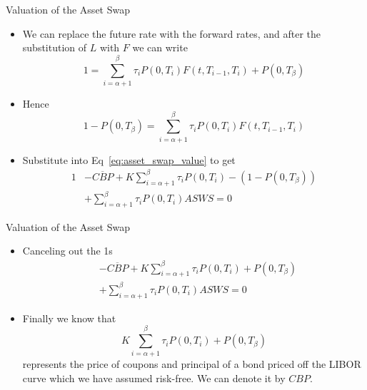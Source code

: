 \documentclass{beamer}
\begin{document}
\begin{frame}{Valuation of the Asset Swap}
	\begin{itemize}
		\item We can replace the future rate with the forward rates, and after the substitution of $L$ with $F$ we can write
		\begin{equation}
			1 = \sum_{i=\alpha+1}^{\beta}\tau_i P(0,T_i)F(t,T_{i-1},T_i)+P(0,T_\beta)
		\end{equation}
		\item Hence 
		\begin{equation}
			1 - P(0,T_\beta) = \sum_{i=\alpha+1}^{\beta}\tau_i P(0,T_i)F(t,T_{i-1},T_i)
		\end{equation}
		\item Substitute into Eq~\ref{eq:asset_swap_value} to get
		\begin{equation}
			\begin{aligned}
				1&-\overline{CBP}+K\sum_{i=\alpha+1}^{\beta}\tau_i P(0,T_i) -(1-P(0,T_\beta)) \\
				&+ \sum_{i=\alpha+1}^{\beta}\tau_i P(0,T_i)ASWS=0
			\end{aligned}
		\end{equation}
	\end{itemize}
\end{frame}

\begin{frame}{Valuation of the Asset Swap}
	\begin{itemize}
		\item Canceling out the 1s
		\begin{equation}
			\begin{aligned}
				&-\overline{CBP}+K\sum_{i=\alpha+1}^{\beta}\tau_i P(0,T_i) +P(0,T_\beta) \\
				& + \sum_{i=\alpha+1}^{\beta}\tau_i P(0,T_i)ASWS=0
			\end{aligned}
		\end{equation}
		\item Finally we know that
		\begin{equation}
			K\sum_{i=\alpha+1}^{\beta}\tau_i P(0,T_i) + P(0,T_\beta)
		\end{equation}
		represents the price of coupons and principal of a bond priced off the LIBOR curve which we have assumed risk-free. We can denote it by $CBP$.
	\end{itemize}
\end{frame}
\end{document}
